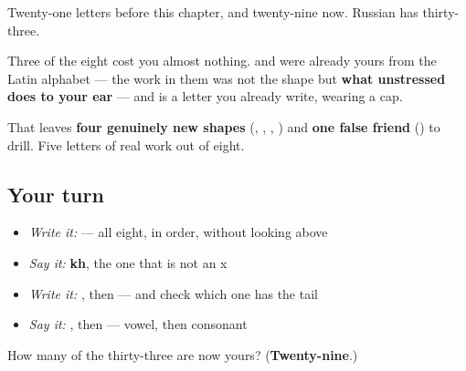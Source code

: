 \begin{grammarlens}[title={What you've built}]
Twenty-one letters before this chapter, and twenty-nine now. Russian has thirty-three.

Three of the eight cost you almost nothing. \textbf{} and \textbf{} were already yours from the Latin alphabet — the work in them was not the shape but \textbf{what unstressed  does to your ear} — and \textbf{} is a letter you already write, wearing a cap.

That leaves \textbf{four genuinely new shapes} (, , , ) and \textbf{one false friend} () to drill. Five letters of real work out of eight.
\end{grammarlens}

\subsection*{Your turn}
\begin{itemize}
\raggedright
  \item \emph{Write it:}         — all eight, in order, without looking above
  \item \emph{Say it:} \textbf{kh}, the one that is not an x
  \item \emph{Write it:} , then  — and check which one has the tail
  \item \emph{Say it:} \textbf{}, then \textbf{} — vowel, then consonant
\end{itemize}

\begin{tcolorbox}[breakable,colback=teal!4,colframe=teal!35!black,title={Before you move on}]
How many of the thirty-three are now yours? (\textbf{Twenty-nine}.)
\end{tcolorbox}
